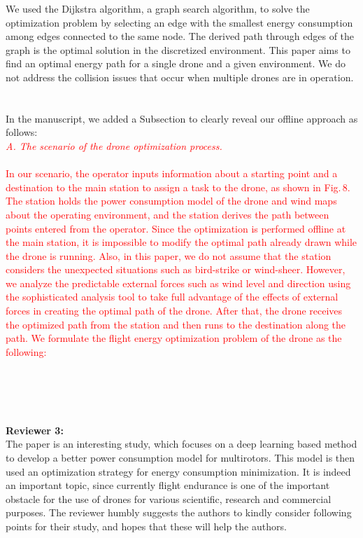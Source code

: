 \documentclass[onecolumn]{IEEEconf}
\begin{document}
\begin{description}
{    We used the Dijkstra algorithm, a graph search algorithm, to solve the optimization problem by selecting an edge with the smallest energy consumption among edges connected to the same node. The derived path through edges of the graph is the optimal solution in the discretized environment.    This paper aims to find an optimal energy path for a single drone and a given environment. We do not address the collision issues that occur when multiple drones are in operation.
	~\\
    ~\\
    In the manuscript, we added a Subsection to clearly reveal our offline approach as follows:~\\
}
\textcolor{red}{
\textcolor{red}{\textit{A. The scenario of the drone optimization process.}}~\\~\\
In our scenario, the operator inputs information about a starting point and a destination to the main station to assign a task to the drone, as shown in Fig.\,8.
The station holds the power consumption model of the drone and wind maps about the operating environment, and the station derives the path between points entered from the operator.
Since the optimization is performed offline at the main station, it is impossible to modify the optimal path already drawn while the drone is running. Also, in this paper, we do not assume that the station considers the unexpected situations such as bird-strike or wind-sheer.
However, we analyze the predictable external forces such as wind level and direction using the sophisticated analysis tool to take full advantage of the effects of external forces in creating the optimal path of the drone. 
After that, the drone receives the optimized path from the station and then runs to the destination along the path. We formulate the flight energy optimization problem of the drone as the following:}
\\
\\
\end{description}
~\\
~\\
~\\
\textbf{\large Reviewer 3:}\\
The paper is an interesting study, which focuses on a deep learning based method to develop a better power consumption model for multirotors.
This model is then used an optimization strategy for energy consumption minimization. It is indeed an important topic, since currently flight endurance is one of the important obstacle for the use of drones for various scientific, research and commercial purposes. The reviewer humbly suggests the authors to kindly consider following points for their study, and hopes that these will help the authors.
\end{document}
